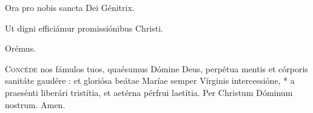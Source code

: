 



\Vbar Ora pro nobis sancta Dei Génitrix.

\Rbar Ut digni efficiámur promissiónibus Christi.

{\centering Orémus.\par}

\lettrine{C}{oncéde} nos fámulos tuos, quaésumus Dómine Deus, perpétua mentis et
córporis sanitáte gaudére : et gloriósa beátae Maríae semper Vírginis
intercessióne, * a praesénti liberári tristítia, et ae\-tér\-na pérfrui
laetítia.
Per Christum Dóminum nostrum. 
\Rbar Amen.
